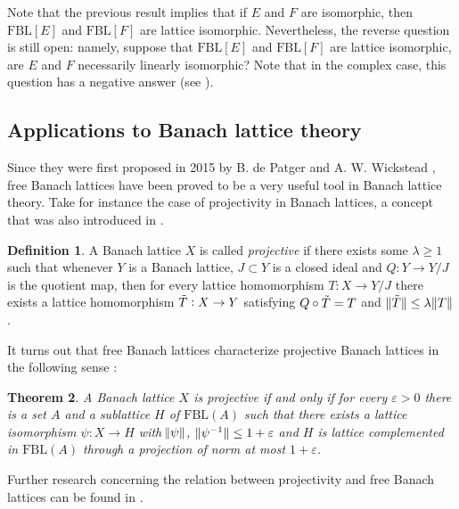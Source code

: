 \documentclass[12pt,leqno]{amsart}
\numberwithin{equation}{section} %
\newtheorem{thm}{Theorem}[section]
\theoremstyle{definition}
\newtheorem{defn}[thm]{Definition}
\numberwithin{equation}{section}
\newcommand{\eps}{\varepsilon}
\newcommand{\fbl}{\mathrm{FBL}}
\begin{document}
Note that the previous result implies that if $E$ and $F$ are isomorphic, then $\fbl[E]$ and $\fbl[F]$ are lattice isomorphic. Nevertheless, the reverse question is still open: namely, suppose that $\fbl[E]$ and $\fbl[F]$ are lattice isomorphic, are $E$ and $F$ necessarily linearly isomorphic? Note that in the complex case, this question has a negative answer (see \cite{dHT}).


\subsection{Applications to Banach lattice theory}
Since they were first proposed in 2015 by B. de Patger and A. W. Wickstead \cite{dePW}, free Banach lattices have been proved to be a very useful tool in Banach lattice theory. Take for instance the case of projectivity in Banach lattices, a concept that was also introduced in \cite{dePW}.

\begin{defn}\label{defi: projective BL}
    A Banach lattice $X$ is called \textit{projective} if there exists some $\lambda\geq 1$ such that whenever $Y$ is a Banach lattice, $J\subset Y$ is a closed ideal and $Q: Y\rightarrow Y/J$ is the quotient map, then for every lattice homomorphism $T:X\rightarrow Y/J$ there exists a lattice homomorphism $\Tilde{T}:X\rightarrow Y$ satisfying $Q\circ \Tilde{T}=T$ and $\norm[0]{\Tilde{T}}\leq \lambda \norm{T}$.
\end{defn}

It turns out that free Banach lattices characterize projective Banach lattices in the following sense \cite[Theorem 10.3]{dePW}:

\begin{thm}\label{theo: characterization projectivity}
    A Banach lattice $X$ is projective if and only if for every $\eps>0$ there is a set $A$ and a sublattice $H$ of $\fbl(A)$ such that there exists a lattice isomorphism $\psi: X\rightarrow H$ with $\norm{\psi}$, $\norm[0]{\psi^{-1}}\leq 1+\eps$ and $H$ is lattice complemented in $\fbl(A)$ through a projection of norm at most $1+\eps$.
\end{thm}
Further research concerning the relation between projectivity and free Banach lattices can be found in \cite{AMR2}.\\
\end{document}
